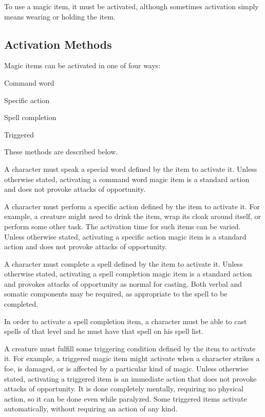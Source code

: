 To use a magic item, it must be activated, although sometimes activation simply means wearing or holding the item.

\subsection{Activation Methods}
Magic items can be activated in one of four ways:

\begin{itemize*}
  \item Command word
  \item Specific action
  \item Spell completion
  \item Triggered
\end{itemize*}

These methods are described below.

 A character must speak a special word defined by the item to activate it. Unless otherwise stated, activating a command word magic item is a standard action and does not provoke attacks of opportunity.

 A character must perform a specific action defined by the item to activate it. For example, a creature might need to drink the item, wrap its cloak around itself, or perform some other task. The activation time for such items can be varied. Unless otherwise stated, activating a specific action magic item is a standard action and does not provoke attacks of opportunity.

 A character must complete a spell defined by the item to activate it. Unless otherwise stated, activating a spell completion magic item is a standard action and provokes attacks of opportunity as normal for casting. Both verbal and somatic components may be required, as appropriate to the spell to be completed.

In order to activate a spell completion item, a character must be able to cast spells of that level and he must have that spell on his spell list.

 A creature must fulfill some triggering condition defined by the item to activate it. For example, a triggered magic item might activate when a character strikes a foe, is damaged, or is affected by a particular kind of magic. Unless otherwise stated, activating a triggered item is an immediate action that does not provoke attacks of opportunity. It is done completely mentally, requiring no physical action, so it can be done even while paralyzed. Some triggered items activate automatically, without requiring an action of any kind.

